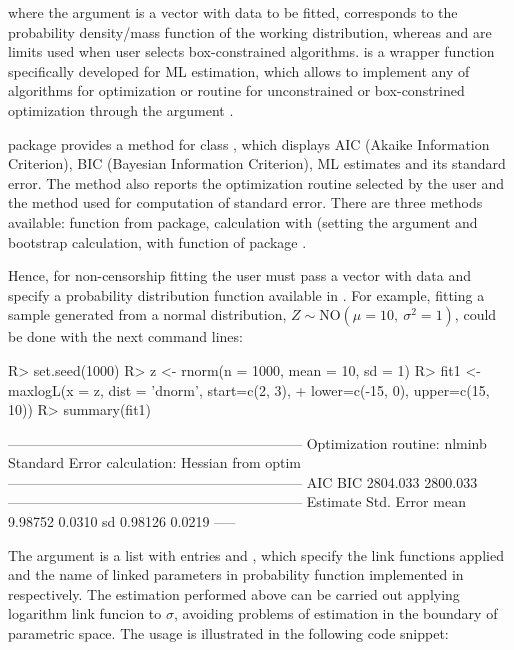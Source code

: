 \documentclass[nojss]{jss}
\begin{document}
where the argument  is a vector with data to be fitted,  corresponds to the probability density/mass function of the working distribution, whereas  and  are limits used when user selects box-constrained algorithms.  is a wrapper function specifically developed for ML estimation, which allows to implement any of  algorithms for optimization or  routine for unconstrained or box-constrined optimization through the argument .

 package provides a  method for class , which displays AIC (Akaike Information Criterion), BIC (Bayesian Information Criterion), ML estimates and its standard error. The method also reports the optimization routine selected by the user and the method used for computation of standard error. There are three methods available:  function from  package, calculation with  (setting the argument  and bootstrap calculation, with  function of  package \citep{Davison1997, Canty2017}.

Hence, for non-censorship fitting the user must pass a vector with data and specify a probability distribution function available in . For example, fitting a sample generated from a normal distribution, $Z \sim \text{NO}(\mu=10,\: \sigma^2=1)$, could be done with the next command lines:

\begin{Schunk}
\begin{Sinput}
R> set.seed(1000)
R> z <- rnorm(n = 1000, mean = 10, sd = 1)
R> fit1 <- maxlogL(x = z, dist = 'dnorm', start=c(2, 3),
+                  lower=c(-15, 0), upper=c(15, 10))
R> summary(fit1)
\end{Sinput}
\begin{Soutput}
---------------------------------------------------------------
Optimization routine: nlminb 
Standard Error calculation: Hessian from optim 
---------------------------------------------------------------
       AIC      BIC
  2804.033 2800.033
---------------------------------------------------------------
     Estimate  Std. Error
mean   9.98752     0.0310
sd     0.98126     0.0219
-----
\end{Soutput}
\end{Schunk}

The  argument is a list with entries  and , which specify the link functions applied and the name of linked parameters in probability function implemented in  respectively. The estimation performed above can be carried out applying logarithm link funcion to $\sigma$, avoiding problems of estimation in the boundary of parametric space. The usage is illustrated in the following code snippet:
\end{document}
